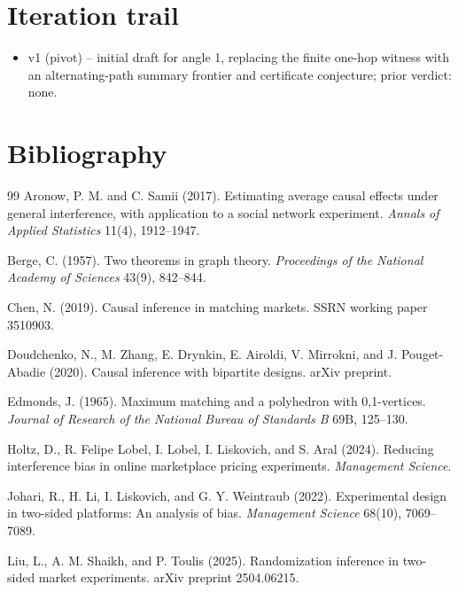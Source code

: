 \documentclass[11pt]{article}
\theoremstyle{definition}
\theoremstyle{plain}
\theoremstyle{remark}
\begin{document}
\section{Iteration trail}
\begin{itemize}[leftmargin=*]
\item v1 (pivot) -- initial draft for angle 1, replacing the finite one-hop witness with an alternating-path summary frontier and certificate conjecture; prior verdict: none.
\end{itemize}

\section*{Bibliography}
\begin{thebibliography}{99}
Aronow, P. M. and C. Samii (2017).
Estimating average causal effects under general interference, with application to a social network experiment.
\emph{Annals of Applied Statistics} 11(4), 1912--1947.

Berge, C. (1957).
Two theorems in graph theory.
\emph{Proceedings of the National Academy of Sciences} 43(9), 842--844.

Chen, N. (2019).
Causal inference in matching markets.
SSRN working paper 3510903.

Doudchenko, N., M. Zhang, E. Drynkin, E. Airoldi, V. Mirrokni, and J. Pouget-Abadie (2020).
Causal inference with bipartite designs.
arXiv preprint.

Edmonds, J. (1965).
Maximum matching and a polyhedron with 0,1-vertices.
\emph{Journal of Research of the National Bureau of Standards B} 69B, 125--130.

Holtz, D., R. Felipe Lobel, I. Lobel, I. Liskovich, and S. Aral (2024).
Reducing interference bias in online marketplace pricing experiments.
\emph{Management Science}.

Johari, R., H. Li, I. Liskovich, and G. Y. Weintraub (2022).
Experimental design in two-sided platforms: An analysis of bias.
\emph{Management Science} 68(10), 7069--7089.

Liu, L., A. M. Shaikh, and P. Toulis (2025).
Randomization inference in two-sided market experiments.
arXiv preprint 2504.06215.


\end{thebibliography}
\end{document}
